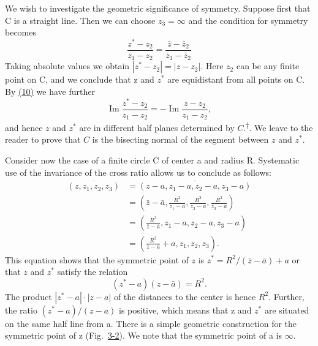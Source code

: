 We wish to investigate the geometric significance of symmetry. Suppose first that C is a straight line. Then we can choose $z_{3} = \infty$ and the condition for symmetry becomes
\begin{equation*}
\frac {z ^ {*} - z _ {2}}{z _ {1} - z _ {2}} = \frac {\bar {z} - \bar {z} _ {2}}{\bar {z} _ {1} - \bar {z} _ {2}}\tag{10}\label{eq:3.10}
\end{equation*}
Taking absolute values we obtain $|z^{*}-z_{2}|=|z-z_{2}|$. Here $z_{2}$ can be any finite point on C, and we conclude that z and $z^{*}$ are equidistant from all points on C. By \hyperref[eq:3.10]{(10)} we have further
\begin{equation*}
\operatorname{Im} \frac {z ^ {*} - z _ {2}}{z _ {1} - z _ {2}} = - \operatorname{Im} \frac {z - z _ {2}}{z _ {1} - z _ {2}},
\end{equation*}
and hence $z$ and $z^*$ are in different half planes determined by $C.$\hyperlink{fn:97:dagger}{\textsuperscript{\ensuremath{\dagger}}}. We leave to the reader to prove that $C$ is the bisecting normal of the segment between $z$ and $z^*$.

Consider now the case of a finite circle C of center a and radius R. Systematic use of the invariance of the cross ratio allows us to conclude as follows:
\begin{equation*}
\begin{aligned}
\overline{(z,z_1,z_2,z_3)}
&=\overline{(z-a,z_1-a,z_2-a,z_3-a)}\\
&=\left(\bar z-\bar a,\frac{R^2}{z_1-a},\frac{R^2}{z_2-a},\frac{R^2}{z_3-a}\right)\\
&=\left(\frac{R^2}{\bar z-\bar a},z_1-a,z_2-a,z_3-a\right)\\
&=\left(\frac{R^2}{\bar z-\bar a}+a,z_1,z_2,z_3\right).
\end{aligned}
\end{equation*}
This equation shows that the symmetric point of $z$ is $z^{*} = R^{2} / (\bar{z} - \bar{a}) + a$ or that $z$ and $z^{*}$ satisfy the relation
\begin{equation*}
(z ^ {*} - a) (z - \bar {a}) = R ^ {2}.\tag{11}\label{eq:3.11}
\end{equation*}
The product $|z^{*}-a|\cdot|z-a|$ of the distances to the center is hence $R^{2}$. Further, the ratio $(z^{*}-a)/(z-a)$ is positive, which means that z and $z^{*}$ are situated on the same half line from a. There is a simple geometric construction for the symmetric point of z (Fig.~\hyperref[fig:3-2]{3-2}). We note that the symmetric point of a is $\infty$.

